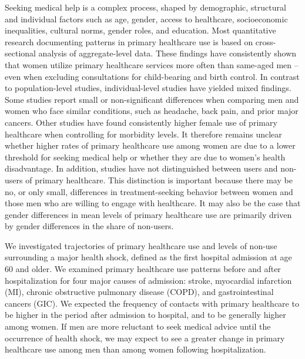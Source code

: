 Seeking medical help is a complex process, shaped by demographic, structural 
and individual factors such as age, gender, access to healthcare, socioeconomic 
inequalities, cultural norms, gender roles, and education.\citep{llanwarne2017wasting,
koefoed2013influence,gallagher2010symptoms,maclean2010rules} Most quantitative 
research documenting patterns in primary healthcare use is based on cross-sectional 
analysis of aggregate-level data. These findings have consistently shown that 
women utilize primary healthcare services more often than same-aged men -- even 
when excluding consultations for child-bearing and birth control.\citep{juel2008men,
wang2013men}  In contrast to population-level studies, individual-level studies 
have yielded mixed findings. Some studies report small or non-significant 
differences when comparing men and women who face similar conditions, such 
as headache, back pain, and prior major cancers.\citep{hunt2011women,wang2014gender,
vos2012does} Other studies have found consistently higher female use of primary 
healthcare when controlling for morbidity levels.\citep{jatrana2009gender,
lyratzopoulos2012variation,fridgen2013help,chang2009gender} It therefore 
remains unclear whether higher rates of primary healthcare use among women 
are due to a lower threshold for seeking medical help or whether they are 
due to women's health disadvantage.\citep{hunt2011women,case2005sex} In 
addition, studies have not distinguished between users and non-users of 
primary healthcare. This distinction is important because there may be no, 
or only small, differences in treatment-seeking behavior between women and 
those men who are willing to engage with healthcare. It may also be the case 
that gender differences in mean levels of primary healthcare use are primarily 
driven by gender differences in the share of non-users.

We investigated trajectories of primary healthcare use and levels of non-use 
surrounding a major health shock, defined as the first hospital admission at 
age 60 and older. We examined primary healthcare use patterns before and after 
hospitalization for four major causes of admission: stroke, myocardial infarction 
(MI), chronic obstructive pulmonary disease (COPD), and gastrointestinal cancers 
(GIC). We expected the frequency of contacts with primary healthcare to be higher 
in the period after admission to hospital, and to be generally higher among women. 
If men are more reluctant to seek medical advice until the occurrence of health 
shock, we may expect to see a greater change in primary healthcare use among men 
than among women following hospitalization.\\



